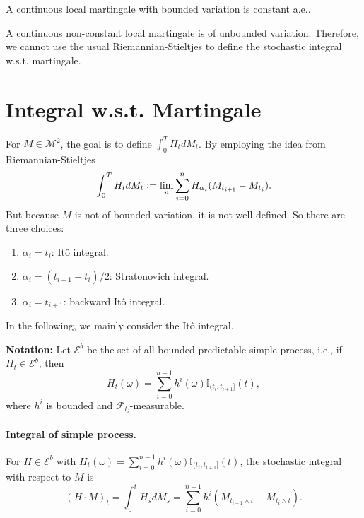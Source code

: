 \begin{lem}
    A continuous local martingale with bounded variation is constant a.e..
\end{lem}
\begin{rmk}
    A continuous non-constant local martingale is of unbounded variation. Therefore, we cannot use the usual Riemannian-Stieltjes to define the stochastic integral w.s.t. martingale.
\end{rmk}

\section{Integral w.s.t. Martingale}

For $M \in \mathcal{M}^2$, the goal is to define $\int_0^T H_tdM_t$. By employing the idea from Riemannian-Stieltjes
\begin{equation*}
   \int_0^T H_tdM_t \vcentcolon= \lim_n \sum_{i=0}^n H_{\alpha_i}(M_{t_{i+1}} - M_{t_i}).
\end{equation*}
But because $M$ is not of bounded variation, it is not well-defined. So there are three choices:
\begin{enumerate}[label=(\roman*)]
    \item $\alpha_i = t_i$: It\^o integral.
    \item $\alpha_i = (t_{i+1}-t_i) /2$: Stratonovich integral.
    \item $\alpha_i = t_{i+1}$: backward It\^o integral.
\end{enumerate}
In the following, we mainly consider the It\^o integral.

\noindent \textbf{Notation:} Let $\mathcal{E}^b$ be the set of all bounded predictable simple process, i.e., if $H_t \in \mathcal{E}^b$, then
\begin{equation*}
    H_t(\omega) = \sum_{i=0}^{n-1} h^i(\omega) \mathbb{I}_{(t_i,t_{i+1}]}(t),
\end{equation*}
where $h^i$ is bounded and $\mathcal{F}_{t_i}$-measurable.

\paragraph{Integral of simple process.}

\begin{defn}
    For $H \in \mathcal{E}^b$ with $H_t(\omega) = \sum_{i=0}^{n-1} h^i(\omega) \mathbb{I}_{(t_i,t_{i+1}]}(t)$, the stochastic integral with respect to $M$ is
    \begin{equation*}
        (H \cdot M)_t = \int_0^t H_s dM_s = \sum_{i=0}^{n-1}h^i(M_{t_{i+1} \wedge t} - M_{t_i \wedge t}).
    \end{equation*}
\end{defn}

